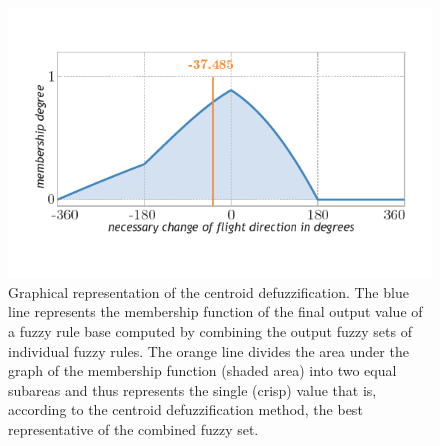 \begin{figure}%
\includegraphics{fig[cog]}
\caption{Graphical representation of the centroid defuzzification. The blue line represents the membership function of the final output value of a fuzzy rule base computed by combining the output fuzzy sets of individual fuzzy rules. The orange line divides the area under the graph of the membership function (shaded area) into two equal subareas and thus represents the single (crisp) value that is, according to the centroid defuzzification method, the best representative of the combined fuzzy set.}
\label{fig:cog}
\end{figure}
